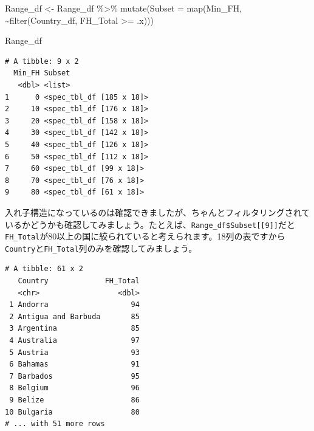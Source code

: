 \documentclass[
  a4paper,
  pandoc,
  ja=standard,
  jafont=haranoaji]{bxjsbook}
\newenvironment{Shaded}{\begin{snugshade}}{\end{snugshade}}
\newcommand{\AttributeTok}[1]{\textcolor[rgb]{0.00,0.48,0.65}{#1}}
\newcommand{\DecValTok}[1]{\textcolor[rgb]{0.68,0.00,0.00}{#1}}
\newcommand{\FunctionTok}[1]{\textcolor[rgb]{0.28,0.35,0.67}{#1}}
\newcommand{\NormalTok}[1]{\textcolor[rgb]{0.00,0.48,0.65}{#1}}
\newcommand{\OtherTok}[1]{\textcolor[rgb]{0.00,0.48,0.65}{#1}}
\newcommand{\SpecialCharTok}[1]{\textcolor[rgb]{0.37,0.37,0.37}{#1}}
\begin{document}
\begin{Shaded}
\begin{Highlighting}[numbers=left,,]
\NormalTok{Range\_df }\OtherTok{\textless{}{-}}\NormalTok{ Range\_df }\SpecialCharTok{\%\textgreater{}\%}
  \FunctionTok{mutate}\NormalTok{(}\AttributeTok{Subset =} \FunctionTok{map}\NormalTok{(Min\_FH, }\SpecialCharTok{\textasciitilde{}}\FunctionTok{filter}\NormalTok{(Country\_df, FH\_Total }\SpecialCharTok{\textgreater{}=}\NormalTok{ .x)))}

\NormalTok{Range\_df}
\end{Highlighting}
\end{Shaded}

\begin{verbatim}
# A tibble: 9 x 2
  Min_FH Subset                  
   <dbl> <list>                  
1      0 <spec_tbl_df [185 x 18]>
2     10 <spec_tbl_df [176 x 18]>
3     20 <spec_tbl_df [158 x 18]>
4     30 <spec_tbl_df [142 x 18]>
5     40 <spec_tbl_df [126 x 18]>
6     50 <spec_tbl_df [112 x 18]>
7     60 <spec_tbl_df [99 x 18]> 
8     70 <spec_tbl_df [76 x 18]> 
9     80 <spec_tbl_df [61 x 18]> 
\end{verbatim}

入れ子構造になっているのは確認できましたが、ちゃんとフィルタリングされているかどうかも確認してみましょう。たとえば、\texttt{Range\_df\$Subset{[}{[}9{]}{]}}だと\texttt{FH\_Total}が80以上の国に絞られていると考えられます。18列の表ですから\texttt{Country}と\texttt{FH\_Total}列のみを確認してみましょう。

\begin{Shaded}
\end{Shaded}

\begin{verbatim}
# A tibble: 61 x 2
   Country             FH_Total
   <chr>                  <dbl>
 1 Andorra                   94
 2 Antigua and Barbuda       85
 3 Argentina                 85
 4 Australia                 97
 5 Austria                   93
 6 Bahamas                   91
 7 Barbados                  95
 8 Belgium                   96
 9 Belize                    86
10 Bulgaria                  80
# ... with 51 more rows
\end{verbatim}
\end{document}
